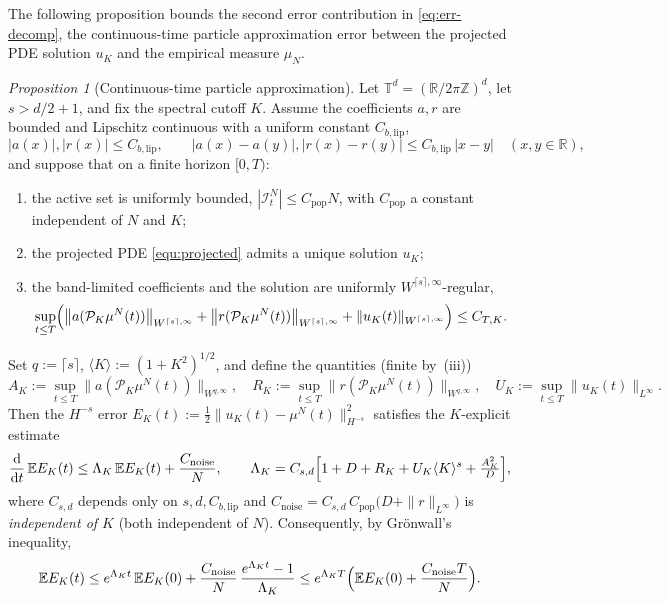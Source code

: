 \documentclass[a4paper,fleqn]{cas-sc}
\theoremstyle{definition}
\theoremstyle{remark}
\newtheorem{proposition}{Proposition}
\begin{document}
The following proposition bounds the second error contribution in \eqref{eq:err-decomp}, the continuous-time particle approximation error between the projected PDE solution $u_K$ and the empirical measure $\mu_N$.
\begin{proposition}[Continuous-time particle approximation]
\label{prop:u_K_mu}
Let $\mathbb T^d=(\mathbb R/2\pi\mathbb Z)^d$, let $s>d/2+1$, and fix the spectral
cutoff $K$. Assume the coefficients $a,r$ are bounded and Lipschitz continuous
with a uniform constant $C_{b,\mathrm{lip}}$,
\[
  |a(x)|,|r(x)|\le C_{b,\mathrm{lip}},\qquad
  |a(x)-a(y)|,|r(x)-r(y)|\le C_{b,\mathrm{lip}}\,|x-y|
  \quad(x,y\in\mathbb R),
\]
and suppose that on a finite horizon $[0,T)$:
\begin{enumerate}
\item[(i)] the active set is uniformly bounded, $|\mathcal I^N_t|\le C_{\mathrm{pop}} N$, with $C_{\mathrm{pop}}$ a
constant independent of $N$ and $K$;
\item[(ii)] the projected PDE \eqref{equ:projected} admits a unique solution $u_K$;
\item[(iii)] the band-limited coefficients and the solution are uniformly
$W^{\lceil s\rceil,\infty}$-regular,
\begin{equation}\label{eq:prop2-coeff}
\sup_{t\le T}\Bigl(\bigl\|a(\mathcal P_K\mu^N(t))\bigr\|_{W^{\lceil s\rceil,\infty}}
+\bigl\|r(\mathcal P_K\mu^N(t))\bigr\|_{W^{\lceil s\rceil,\infty}}
+\|u_K(t)\|_{W^{\lceil s\rceil,\infty}}\Bigr)\le C_{T,K}.
\end{equation}
\end{enumerate}
Set $q:=\lceil s\rceil$, $\langle K\rangle:=(1+K^2)^{1/2}$, and define the quantities
(finite by~(iii))
\[
A_K:=\sup_{t\le T}\bigl\|a(\mathcal P_K\mu^N(t))\bigr\|_{W^{q,\infty}},\quad
R_K:=\sup_{t\le T}\bigl\|r(\mathcal P_K\mu^N(t))\bigr\|_{W^{q,\infty}},\quad
U_K:=\sup_{t\le T}\|u_K(t)\|_{L^\infty}.
\]
Then the $H^{-s}$ error $E_K(t):=\tfrac12\|u_K(t)-\mu^N(t)\|_{H^{-s}}^2$ satisfies the
$K$-explicit estimate
\[
\frac{\mathrm{d}}{\mathrm{d} t}\,\mathbb E E_K(t)\le\Lambda_K\,\mathbb E E_K(t)+\frac{C_{\mathrm{noise}}}{N},
\qquad
\Lambda_K=C_{s,d}\Bigl[1+D+R_K+U_K\langle K\rangle^{s}+\tfrac{A_K^2}{D}\Bigr],
\]
where $C_{s,d}$ depends only on $s,d,C_{b,\mathrm{lip}}$ and
$C_{\mathrm{noise}}=C_{s,d}\,C_{\mathrm{pop}}\bigl(D+\|r\|_{L^\infty}\bigr)$ is \emph{independent of $K$}
(both independent of $N$). Consequently, by Gr\"onwall's inequality,
\[
\mathbb E E_K(t)\le e^{\Lambda_K t}\,\mathbb E E_K(0)+\frac{C_{\mathrm{noise}}}{N}\,
\frac{e^{\Lambda_K t}-1}{\Lambda_K}
\le e^{\Lambda_K T}\Bigl(\mathbb E E_K(0)+\frac{C_{\mathrm{noise}}T}{N}\Bigr).
\]
\end{proposition}
\end{document}

